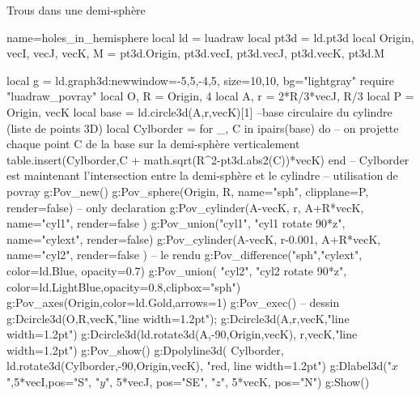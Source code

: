 \begin{demo}{Trous dans une demi-sphère}
\begin{luadraw}{name=holes_in_hemisphere}
local ld = luadraw
local pt3d = ld.pt3d
local Origin, vecI, vecJ, vecK, M = pt3d.Origin, pt3d.vecI, pt3d.vecJ, pt3d.vecK, pt3d.M

local g = ld.graph3d:new{window={-5,5,-4,5}, size={10,10}, bg="lightgray"}
require "luadraw_povray"
local O, R = Origin, 4
local A, r = 2*R/3*vecJ, R/3
local P = {Origin, vecK}
local base = ld.circle3d(A,r,vecK)[1] --base circulaire du cylindre (liste de points 3D)
local Cylborder = {}
for _, C in ipairs(base) do -- on projette chaque point C de la base sur la demi-sphère verticalement
    table.insert(Cylborder,C + math.sqrt(R^2-pt3d.abs2(C))*vecK)
end -- Cylborder est maintenant l'intersection entre la demi-sphère et le cylindre
-- utilisation de povray 
g:Pov_new()
g:Pov_sphere(Origin, R, {name="sph", clipplane=P, render=false}) -- only declaration
g:Pov_cylinder(A-vecK, r, A+R*vecK, {name="cyl1", render=false })
g:Pov_union({"cyl1", "cyl1 rotate 90*z"}, {name="cylext", render=false})
g:Pov_cylinder(A-vecK, r-0.001, A+R*vecK, {name="cyl2", render=false }) 
-- le rendu
g:Pov_difference({"sph","cylext"}, {color=ld.Blue, opacity=0.7})
g:Pov_union( {"cyl2", "cyl2 rotate 90*z"}, {color=ld.LightBlue,opacity=0.8,clipbox="sph"})
g:Pov_axes(Origin,{color=ld.Gold,arrows=1})
g:Pov_exec()
-- dessin
g:Dcircle3d(O,R,vecK,"line width=1.2pt"); g:Dcircle3d(A,r,vecK,"line width=1.2pt")
g:Dcircle3d(ld.rotate3d(A,-90,{Origin,vecK}), r,vecK,"line width=1.2pt")
g:Pov_show()
g:Dpolyline3d( {Cylborder, ld.rotate3d(Cylborder,-90,{Origin,vecK})}, "red, line width=1.2pt")
g:Dlabel3d("$x$",5*vecI,{pos="S"}, "$y$", 5*vecJ, {pos="SE"}, "$z$", 5*vecK, {pos="N"})
g:Show()
\end{luadraw}
\end{demo}

